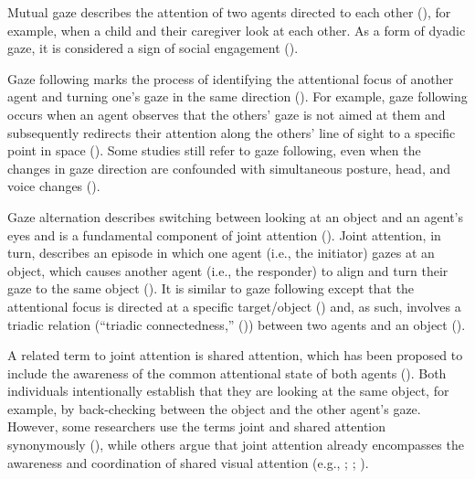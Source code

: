 \documentclass[
]{scrbook}
\begin{document}
Mutual gaze describes the attention of two agents directed to each other (), for example, when a child and their caregiver look at each other. As a form of dyadic gaze, it is considered a sign of social engagement ().

Gaze following marks the process of identifying the attentional focus of another agent and turning one's gaze in the same direction (). For example, gaze following occurs when an agent observes that the others' gaze is not aimed at them and subsequently redirects their attention along the others' line of sight to a specific point in space (). Some studies still refer to gaze following, even when the changes in gaze direction are confounded with simultaneous posture, head, and voice changes ().

Gaze alternation describes switching between looking at an object and an agent's eyes and is a fundamental component of joint attention (). Joint attention, in turn, describes an episode in which one agent (i.e., the initiator) gazes at an object, which causes another agent (i.e., the responder) to align and turn their gaze to the same object (). It is similar to gaze following except that the attentional focus is directed at a specific target/object () and, as such, involves a triadic relation (``triadic connectedness,'' ()) between two agents and an object ().

A related term to joint attention is shared attention, which has been proposed to include the awareness of the common attentional state of both agents (). Both individuals intentionally establish that they are looking at the same object, for example, by back-checking between the object and the other agent's gaze. However, some researchers use the terms joint and shared attention synonymously (), while others argue that joint attention already encompasses the awareness and coordination of shared visual attention (e.g., ; ; ).
\end{document}
